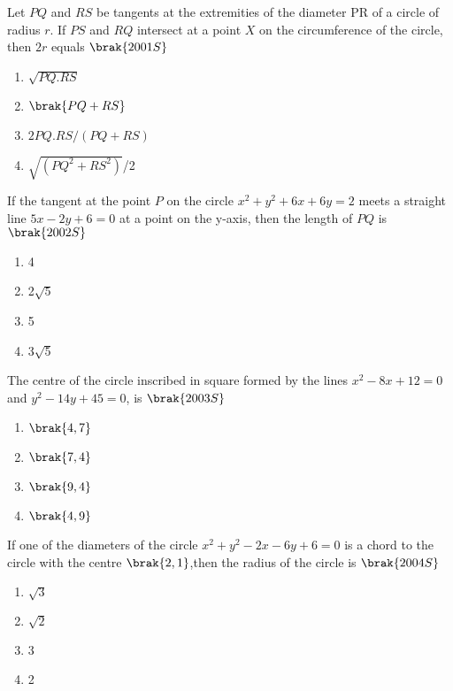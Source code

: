         \item Let $PQ$ and $RS$ be tangents at the extremities of the diameter PR of a circle of radius $r$. If $PS$ and $RQ$ intersect at a point $X$ on the circumference of the circle, then $2r$ equals
        \hfill$\brak{2001S}$
        \begin{multicols}{2}
        \begin{enumerate}
    \item $\sqrt{PQ.RS}$
     \item $\brak{PQ+RS}$
    \item $2PQ.RS/(PQ+RS)$
     \item {$\sqrt{(PQ^2+RS^2)}$}/2
     \end{enumerate}
     \end{multicols}
     \item If the tangent at the point $P$ on the circle $x^2+y^2+6x+6y=2$ meets a straight line $5x-2y+6=0$ at a point on the y-axis, then the length of $PQ$ is 
             \hfill$\brak{2002S}$
             \begin{multicols}{2}
         \begin{enumerate}
             \item 4
             \item 2$\sqrt5$
             \item 5
             \item 3$\sqrt5$
\end{enumerate}
\end{multicols}
     \item The centre of the circle inscribed in square formed by the lines $x^2-8x+12=0$ and $y^2-14y+45=0$, is
         \hfill$\brak{2003S}$
         \begin{multicols}{2}
     \begin{enumerate}
         \item $\brak{4,7}$
         \item $\brak{7,4}$
         \item $\brak{9,4}$
         \item $\brak{4,9}$
     \end{enumerate}
     \end{multicols}
     \item If one of the diameters of the circle $x^2+y^2-2x-6y+6=0$ is a chord to the circle with the centre $\brak{2,1}$,then the radius of the circle is 
         \hfill$\brak{2004S}$
         \begin{multicols}{2}
     \begin{enumerate}
         \item $\sqrt3$
         \item $\sqrt2$
         \item 3
         \item 2
     \end{enumerate}
     \end{multicols}
